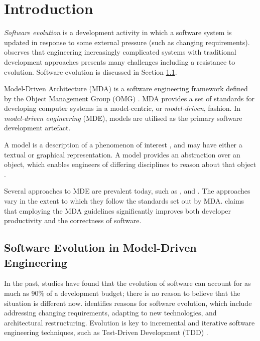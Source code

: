 

\section{Introduction}
\label{sec:introduction}

\textit{Software evolution} is a development activity in which a software system is updated in response to some external pressure (such as changing requirements). \cite{brooks86nosilverbullet} observes that engineering increasingly complicated systems with traditional development approaches presents many challenges including a resistance to evolution. Software evolution is discussed in Section \ref{sub:software_evo}.

Model-Driven Architecture (MDA) is a software engineering framework defined by the Object Management
Group (OMG) \cite{omg}. MDA provides a set of standards for developing computer systems in a model-centric, or \textit{model-driven}, fashion. In \textit{model-driven engineering} (MDE), models are utilised as the primary software development artefact.

A model is a description of a phenomenon of interest \cite{jackson96software}, and may have either a textual or graphical representation. A model provides an abstraction over an object, which enables engineers of differing disciplines to reason about that object \cite{kolovos06eol}.

Several approaches to MDE are prevalent today, such as \cite{stahl06mdsd}, \cite{kelly08dsm} and \cite{greenfield04software}. The approaches vary in the extent to which they follow the standards set out by MDA. \cite{watson08mdahistory} claims that employing the MDA guidelines significantly improves both developer productivity and the correctness of software.

\subsection{Software Evolution in Model-Driven Engineering}
\label{sub:software_evo}
In the past, studies \cite{erlikh00leveraging,moad90maintaining} have found that the evolution of software can account for as much as 90\% of a development budget; there is no reason to believe that the situation is different now. \cite{sjoberg93quantifying} identifies reasons for software evolution, which include addressing changing requirements, adapting to new technologies, and architectural restructuring. Evolution is key to incremental and iterative software engineering techniques, such as Test-Driven Development (TDD) \cite{beck02tdd}.

